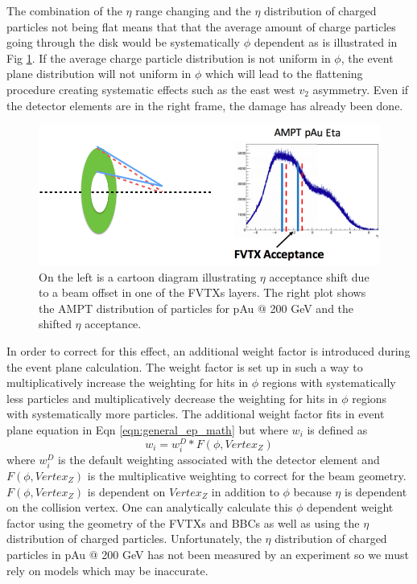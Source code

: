 The combination of the $\eta$ range changing and the $\eta$ distribution of charged particles not being flat means that that the average amount of charge particles going through the disk would be systematically $\phi$ dependent as is illustrated in Fig \ref{fig:tilt_effect}. If the average charge particle distribution is not uniform in $\phi$, the event plane distribution will not uniform in $\phi$ which will lead to the flattening procedure creating systematic effects such as the east west $v_2$ asymmetry. Even if the detector elements are in the right frame, the damage has already been done.

\begin{figure}
\begin{center}
\includegraphics[width=0.95\linewidth]{figs/tilt_effect.png}
\caption{On the left is a cartoon diagram illustrating $\eta$ acceptance shift due to a beam offset in one of the FVTXs layers. The right plot shows the AMPT distribution of particles for pAu @ 200 GeV and the shifted $\eta$ acceptance. }
\label{fig:tilt_effect}
\end{center}
\end{figure}

In order to correct for this effect, an additional weight factor is introduced during the event plane calculation. The weight factor is set up in such a way to multiplicatively increase the weighting for hits in $\phi$ regions with systematically less particles and multiplicatively decrease the weighting for hits in $\phi$ regions with systematically more particles. The additional weight factor fits in event plane equation in Eqn \ref{eqn:general_ep_math} but where $w_i$ is defined as
\begin{equation}
w_i = w^D_i*F(\phi,Vertex_Z)
\label{eqn:modified_weight}
\end{equation}
where $w^D_i$ is the default weighting associated with the detector element and $F(\phi,Vertex_Z)$ is the multiplicative weighting to correct for the beam geometry. $F(\phi,Vertex_Z)$ is dependent on $Vertex_Z$ in addition to $\phi$ because $\eta$ is dependent on the collision vertex. One can analytically calculate this $\phi$ dependent weight factor using the geometry of the FVTXs and BBCs as well as using the $\eta$ distribution of charged particles. Unfortunately, the $\eta$ distribution of charged particles in pAu @ 200 GeV has not been measured by an experiment so we must rely on models which may be inaccurate.

